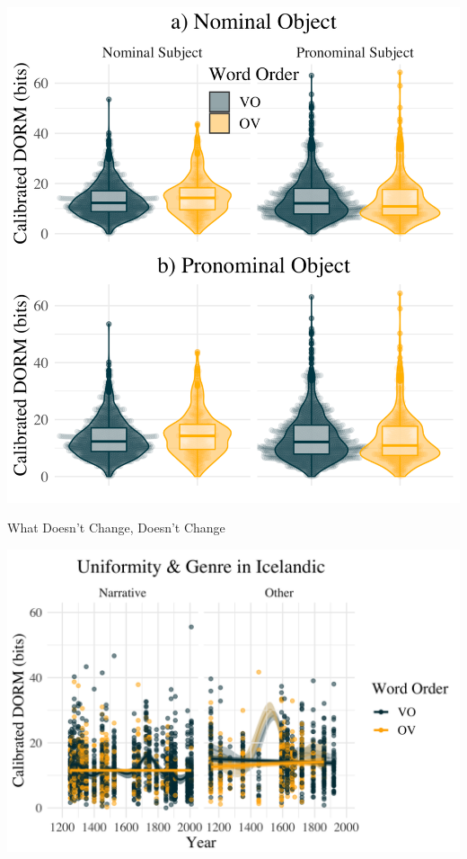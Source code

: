 \documentclass[hyperref={pdfpagelabels=false}]{beamer}
\begin{document}
\begin{frame}%
	
	
	\begin{center}
	\includegraphics[scale = 0.57]{NewFigType3.png}
\end{center}
	
\end{frame}

\begin{frame}{What Doesn't Change, Doesn't Change} 
	
	
		\includegraphics[scale = 0.2]{IcelandicGenreOutlierBehind.png}
	
\end{frame}
\end{document}
